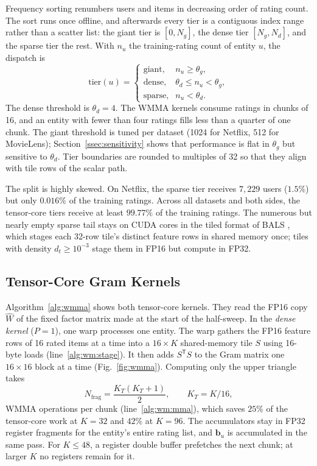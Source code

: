 Frequency sorting renumbers users and items in decreasing order of rating count. The sort runs once offline, and afterwards every tier is a contiguous index range rather than a scatter list: the giant tier is $[0, N_g]$, the dense tier $[N_g, N_d]$, and the sparse tier the rest. With $n_u$ the training-rating count of entity $u$, the dispatch is
\begin{equation}
\text{tier}(u) =
\begin{cases}
\text{giant}, & n_u \ge \theta_g, \\
\text{dense}, & \theta_d \le n_u < \theta_g, \\
\text{sparse}, & n_u < \theta_d .
\end{cases}
\label{eq:tier_def}
\end{equation}
The dense threshold is $\theta_d = 4$. The WMMA kernels consume ratings in chunks of 16, and an entity with fewer than four ratings fills less than a quarter of one chunk. The giant threshold is tuned per dataset (1024 for Netflix, 512 for MovieLens); Section~\ref{ssec:sensitivity} shows that performance is flat in $\theta_g$ but sensitive to $\theta_d$. Tier boundaries are rounded to multiples of 32 so that they align with tile rows of the scalar path.

The split is highly skewed. On Netflix, the sparse tier receives $7{,}229$ users ($1.5\%$) but only $0.016\%$ of the training ratings. Across all datasets and both sides, the tensor-core tiers receive at least $99.77\%$ of the training ratings. The numerous but nearly empty sparse tail stays on CUDA cores in the tiled format of BALS \cite{chen2021bals}, which stages each 32-row tile's distinct feature rows in shared memory once; tiles with density $d_t \ge 10^{-3}$ stage them in FP16 but compute in FP32.

\subsection{Tensor-Core Gram Kernels}
\label{ssec:wmma}

Algorithm~\ref{alg:wmma} shows both tensor-core kernels. They read the FP16 copy $\widehat{W}$ of the fixed factor matrix made at the start of the half-sweep. In the \textit{dense kernel} ($P=1$), one warp processes one entity. The warp gathers the FP16 feature rows of 16 rated items at a time into a $16 \times K$ shared-memory tile $S$ using 16-byte loads (line~\ref{alg:wm:stage}). It then adds $S^{\mathsf{T}} S$ to the Gram matrix one $16 \times 16$ block at a time (Fig.~\ref{fig:wmma}). Computing only the upper triangle takes
\begin{equation}
N_{\text{frag}} = \frac{K_T (K_T + 1)}{2}, \qquad K_T = K/16,
\label{eq:frag_count}
\end{equation}
WMMA operations per chunk (line~\ref{alg:wm:mma}), which saves $25\%$ of the tensor-core work at $K=32$ and $42\%$ at $K=96$. The accumulators stay in FP32 register fragments for the entity's entire rating list, and $\mathbf{b}_u$ is accumulated in the same pass. For $K \le 48$, a register double buffer prefetches the next chunk; at larger $K$ no registers remain for it.

